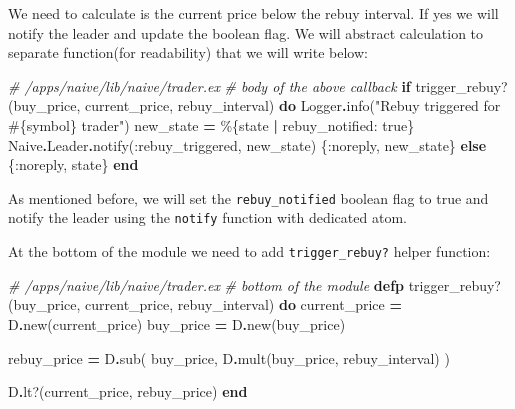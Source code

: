 \documentclass[
  oneside]{book}
\newenvironment{Shaded}{\begin{snugshade}}{\end{snugshade}}
\newcommand{\CommentTok}[1]{\textcolor[rgb]{0.56,0.35,0.01}{\textit{#1}}}
\newcommand{\ConstantTok}[1]{\textcolor[rgb]{0.00,0.00,0.00}{#1}}
\newcommand{\ControlFlowTok}[1]{\textcolor[rgb]{0.13,0.29,0.53}{\textbf{#1}}}
\newcommand{\KeywordTok}[1]{\textcolor[rgb]{0.13,0.29,0.53}{\textbf{#1}}}
\newcommand{\NormalTok}[1]{#1}
\newcommand{\OperatorTok}[1]{\textcolor[rgb]{0.81,0.36,0.00}{\textbf{#1}}}
\newcommand{\OtherTok}[1]{\textcolor[rgb]{0.56,0.35,0.01}{#1}}
\newcommand{\StringTok}[1]{\textcolor[rgb]{0.31,0.60,0.02}{#1}}
\newcommand{\VariableTok}[1]{\textcolor[rgb]{0.00,0.00,0.00}{#1}}
\begin{document}
We need to calculate is the current price below the rebuy interval. If yes we will notify the leader and update the boolean flag. We will abstract calculation to separate function(for readability) that we will write below:

\begin{Shaded}
\begin{Highlighting}[]
    \CommentTok{\# /apps/naive/lib/naive/trader.ex}
    \CommentTok{\# body of the above callback}
    \ControlFlowTok{if}\NormalTok{ trigger\_rebuy?(buy\_price, current\_price, rebuy\_interval) }\KeywordTok{do}
      \ConstantTok{Logger}\OperatorTok{.}\NormalTok{info(}\StringTok{"Rebuy triggered for }\OtherTok{\#\{}\NormalTok{symbol}\OtherTok{\}}\StringTok{ trader"}\NormalTok{)}
\NormalTok{      new\_state }\OperatorTok{=}\NormalTok{ \%\{state }\OperatorTok{|} \VariableTok{rebuy\_notified:} \ConstantTok{true}\NormalTok{\}}
      \ConstantTok{Naive}\OperatorTok{.}\ConstantTok{Leader}\OperatorTok{.}\NormalTok{notify(}\VariableTok{:rebuy\_triggered}\NormalTok{, new\_state)}
\NormalTok{      \{}\VariableTok{:noreply}\NormalTok{, new\_state\}}
    \ControlFlowTok{else}
\NormalTok{      \{}\VariableTok{:noreply}\NormalTok{, state\}}
    \KeywordTok{end}
\end{Highlighting}
\end{Shaded}

As mentioned before, we will set the \texttt{rebuy\_notified} boolean flag to true and notify the leader using the \texttt{notify} function with dedicated atom.

At the bottom of the module we need to add \texttt{trigger\_rebuy?} helper function:

\begin{Shaded}
\begin{Highlighting}[]
  \CommentTok{\# /apps/naive/lib/naive/trader.ex}
  \CommentTok{\# bottom of the module}
  \KeywordTok{defp}\NormalTok{ trigger\_rebuy?(buy\_price, current\_price, rebuy\_interval) }\KeywordTok{do}
\NormalTok{    current\_price }\OperatorTok{=}\NormalTok{ D}\OperatorTok{.}\NormalTok{new(current\_price)}
\NormalTok{    buy\_price }\OperatorTok{=}\NormalTok{ D}\OperatorTok{.}\NormalTok{new(buy\_price)}

\NormalTok{    rebuy\_price }\OperatorTok{=}
\NormalTok{      D}\OperatorTok{.}\NormalTok{sub(}
\NormalTok{        buy\_price,}
\NormalTok{        D}\OperatorTok{.}\NormalTok{mult(buy\_price, rebuy\_interval)}
\NormalTok{      )}

\NormalTok{    D}\OperatorTok{.}\NormalTok{lt?(current\_price, rebuy\_price)}
  \KeywordTok{end}
\end{Highlighting}
\end{Shaded}
\end{document}
